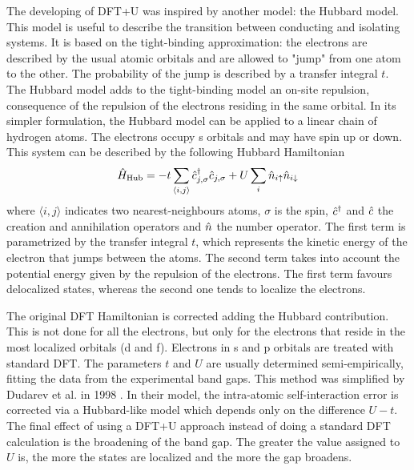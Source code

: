 The developing of DFT+U was inspired by another model: the Hubbard model. This model is useful to describe the transition between conducting and isolating systems. It is based on the tight-binding approximation: the electrons are described by the usual atomic orbitals and are allowed to "jump" from one atom to the other. The probability of the jump is described by a transfer integral $t$. The Hubbard model adds to the tight-binding model an on-site repulsion, consequence of the repulsion of the electrons residing in the same orbital. In its simpler formulation, the Hubbard model can be applied to a linear chain of hydrogen atoms. The electrons occupy s orbitals and may have spin up or down. This system can be described by the following Hubbard Hamiltonian
\begin{equation}
    \hat{H}_\text{Hub} = -t \sum_{\langle i,j \rangle} \hat{c}^\dagger_{j,\sigma}\hat{c}_{j,\sigma} + U \sum_i \hat{n}_{i\uparrow} \hat{n}_{i\downarrow}
\end{equation}
where $\langle i,j \rangle$ indicates two nearest-neighbours atoms, $\sigma$ is the spin, $\hat{c}^\dagger$ and $\hat{c}$ the creation and annihilation operators and $\hat{n}$ the number operator. The first term is parametrized by the transfer integral $t$, which represents the kinetic energy of the electron that jumps between the atoms. The second term takes into account the potential energy given by the repulsion of the electrons. The first term favours delocalized states, whereas the second one tends to localize the electrons.

The original DFT Hamiltonian is corrected adding the Hubbard contribution. This is not done for all the electrons, but only for the electrons that reside in the most localized orbitals (d and f). Electrons in s and p orbitals are treated with standard DFT. The parameters $t$ and $U$ are usually determined semi-empirically, fitting the data from the experimental band gaps. This method was simplified by Dudarev et al. in 1998 \cite{dudarev1998}. In their model, the intra-atomic self-interaction error is corrected via a Hubbard-like model which depends only on the difference $U-t$. The final effect of using a DFT+U approach instead of doing a standard DFT calculation is the broadening of the band gap. The greater the value assigned to $U$ is, the more the states are localized and the more the gap broadens.


